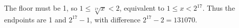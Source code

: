 The floor must be 1, so $ 1\le\sqrt[17]{x}<2 $, equivalent to $ 1\le x<2^{17}$. Thus the endpoints are 1 and $ 2^{17}-1 $, with difference $\boxed{2^{17}-2=131070}$.
